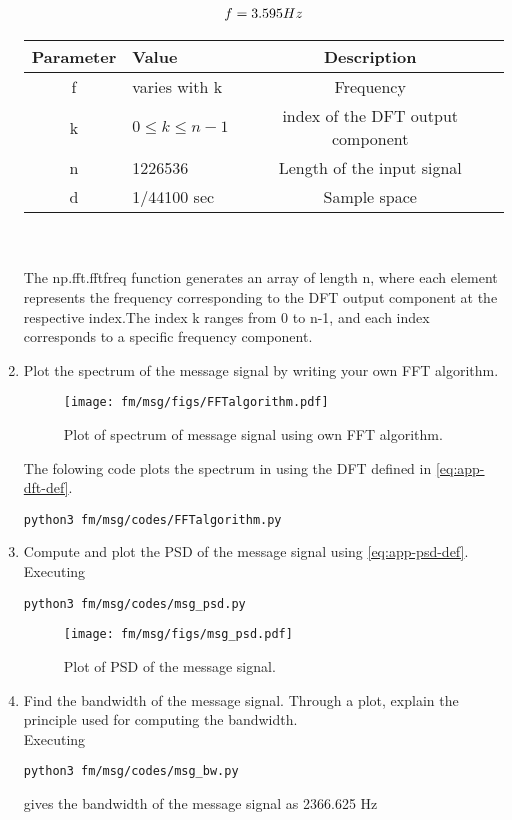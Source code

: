 \begin{enumerate}[label=\arabic*.,ref=\thesection.\theenumi]
\begin{align}
\centering
f = 3.595 Hz
\end{align}
\begin{tabular}{|c|l|c|}
    \hline 
    \textbf{Parameter} & \textbf{Value} &\textbf{Description} \\ \hline
    f  & varies with k  & Frequency \\
    k  &  $0 \leq k \leq n-1$  &index of the DFT output component\\
    n  & 1226536  &Length of the input signal\\  
    d  & 1/44100 sec  & Sample space\\ \hline 
\end{tabular}
    \\ \\

The np.fft.fftfreq function generates an array of length n, where each element represents the frequency corresponding to the DFT output component at the respective index.The index k ranges from 0 to n-1, and each index corresponds to a specific frequency component.\\
\item Plot the spectrum of the message signal by writing your own FFT algorithm.\\
	\solution
\begin{figure}[H]
\centering
\texttt{[image: fm/msg/figs/FFTalgorithm.pdf]}
\caption{Plot of spectrum of message signal using own FFT algorithm.}
\label{fig:FFTo}
\end{figure}
The folowing code plots the spectrum in  using the DFT defined in  \eqref{eq:app-dft-def}.
\begin{lstlisting}
python3 fm/msg/codes/FFTalgorithm.py
\end{lstlisting}
\item Compute and plot the PSD of the message signal using 
\eqref{eq:app-psd-def}.
\\
	\solution
Executing	
\begin{lstlisting}
python3 fm/msg/codes/msg_psd.py
\end{lstlisting}

\begin{figure}[H]
\centering
\texttt{[image: fm/msg/figs/msg\_psd.pdf]}
\caption{Plot of PSD of the message signal.}
\label{fig:PSD}
\end{figure}

\item Find the bandwidth of the message signal. Through a plot, explain the principle used for computing the bandwidth.\\
\solution 
Executing
\begin{lstlisting}
python3 fm/msg/codes/msg_bw.py
\end{lstlisting}
gives the bandwidth of the message signal as 2366.625 Hz
\\
\iffalse
\begin{lstlisting}
/fm/FM/codes/input.py
\end{lstlisting}
\fi

\end{enumerate}
